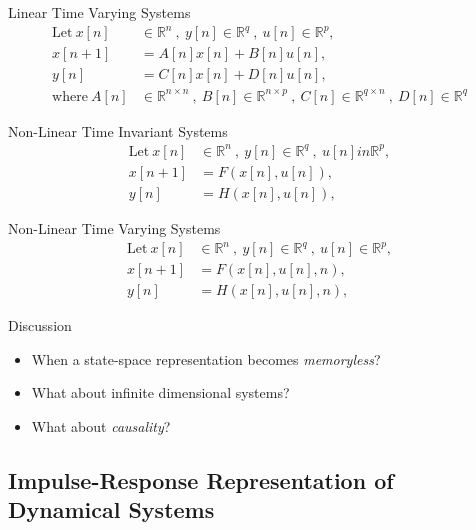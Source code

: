 \documentclass[twoside]{article}
\begin{document}
\begin{itemize}
\vspace{12pt}

Linear Time Varying Systems
%
\begin{align*}
  \mathrm{Let} \ x[n] &\in \mathbb{R}^n \ , \ y[n] \in \mathbb{R}^q \ ,\  u[n] \in
  \mathbb{R}^p , \\
  x[n+1] &= A[n] x[n] + B[n] u[n] , \\
  y[n] &= C[n] x[n] + D[n] u[n] , \\
  \mathrm{where} \ A[n] &\in \mathbb{R}^{n \times n} \ , \ 
    B[n] \in \mathbb{R}^{n \times p} \ ,\  C[n] \in \mathbb{R}^{q
                          \times  n} \ , \ D[n] \in \mathbb{R}^q
\end{align*}

Non-Linear Time Invariant Systems
%
\begin{align*}
  \mathrm{Let} \ x[n] &\in \mathbb{R}^n \ , \ y[n] \in \mathbb{R}^q \ ,\
                        u[n] in \mathbb{R}^p , \\
  x[n+1] &= F(x[n],u[n]) , \\
  y[n] &= H(x[n],u[n]) , 
\end{align*}

Non-Linear Time Varying Systems
%
\begin{align*}
  \mathrm{Let} \ x[n] &\in \mathbb{R}^n \ , \ y[n] \in \mathbb{R}^q \ ,\  u[n] \in
  \mathbb{R}^p , \\
  x[n+1] &= F(x[n],u[n],n) , \\
  y[n] &= H(x[n],u[n],n) , 
\end{align*}

\end{itemize}

\vspace{12pt}

Discussion 

\vspace{6pt}

\begin{itemize}
  \item When a state-space representation becomes \textit{memoryless}?
  \item What about infinite dimensional systems?
  \item What about \textit{causality}?    
\end{itemize}

\vspace{12pt}

\subsection{Impulse-Response Representation of Dynamical Systems}
\end{document}
